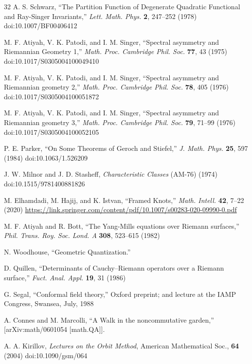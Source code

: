 \begin{thebibliography}{32}
 A. S. Schwarz, ``The Partition Function of Degenerate Quadratic Functional and Ray-Singer Invariants,'' \emph{Lett. Math. Phys.} \textbf{2}, 247--252 (1978) doi:10.1007/BF00406412

 M. F. Atiyah, V. K. Patodi, and I. M. Singer, ``Spectral asymmetry and Riemannian Geometry 1,'' \emph{Math. Proc. Cambridge Phil. Soc.} \textbf{77}, 43 (1975) doi:10.1017/S0305004100049410

 M. F. Atiyah, V. K. Patodi, and I. M. Singer, ``Spectral asymmetry and Riemannian geometry 2,'' \emph{Math. Proc. Cambridge Phil. Soc.} \textbf{78}, 405 (1976) doi:10.1017/S0305004100051872

 M. F. Atiyah, V. K. Patodi, and I. M. Singer, ``Spectral asymmetry and Riemannian geometry 3,'' \emph{Math. Proc. Cambridge Phil. Soc.} \textbf{79}, 71--99 (1976) doi:10.1017/S0305004100052105

 P. E. Parker, ``On Some Theorems of Geroch and Stiefel,'' \emph{J. Math. Phys.} \textbf{25}, 597 (1984) doi:10.1063/1.526209

 J. W. Milnor and J. D. Stasheff, \emph{Characteristic Classes} (AM-76) (1974) doi:10.1515/9781400881826

 M. Elhamdadi, M. Hajij, and K. Istvan, ``Framed Knots,'' \emph{Math. Intell.} \textbf{42}, 7--22 (2020) \href{https://link.springer.com/content/pdf/10.1007/s00283-020-09990-0.pdf}{https://link.springer.com/content/pdf/10.1007/s00283-020-09990-0.pdf}

 M. F. Atiyah and R. Bott, ``The Yang-Mills equations over Riemann surfaces,'' \emph{Phil. Trans. Roy. Soc. Lond. A} \textbf{308}, 523--615 (1982)

 N. Woodhouse, ``Geometric Quantization.''

 D. Quillen, ``Determinants of Cauchy--Riemann operators over a Riemann surface,'' \emph{Fuct. Anal. Appl.} \textbf{19}, 31 (1986)

 G. Segal, ``Conformal field theory,'' Oxford preprint; and lecture at the IAMP Congress, Swansea, July, 1988

 A. Connes and M. Marcolli, ``A Walk in the noncommutative garden,'' [arXiv:math/0601054 [math.QA]].

 A. A. Kirillov, \emph{Lectures on the Orbit Method}, American Mathematical Soc., \textbf{64} (2004) doi:10.1090/gsm/064


\end{thebibliography}
